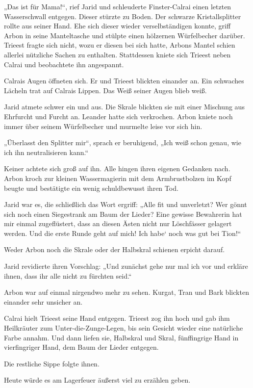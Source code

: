 „Das ist für Mama!“, rief Jarid und schleuderte Finster-Calrai einen letzten Wasserschwall entgegen. Dieser stürzte zu Boden. Der schwarze Kristallsplitter rollte aus seiner Hand. Ehe sich dieser wieder verselbständigen konnte, griff Arbon in seine Manteltasche und stülpte einen hölzernen Würfelbecher darüber. Trieest fragte sich nicht, wozu er diesen bei sich hatte, Arbons Mantel schien allerlei nützliche Sachen zu enthalten. Stattdessen kniete sich Trieest neben Calrai und beobachtete ihn angespannt.

Calrais Augen öffneten sich. Er und Trieest blickten einander an. Ein schwaches Lächeln trat auf Calrais Lippen. Das Weiß seiner Augen blieb weiß.

Jarid atmete schwer ein und aus. Die Skrale blickten sie mit einer Mischung aus Ehrfurcht und Furcht an. Leander hatte sich verkrochen. Arbon kniete noch immer über seinem Würfelbecher und murmelte leise vor sich hin.

„Überlasst den Splitter mir“, sprach er beruhigend, „Ich weiß schon genau, wie ich ihn neutralisieren kann.“

Keiner achtete sich groß auf ihn. Alle hingen ihren eigenen Gedanken nach. Arbon kroch zur kleinen Wassermagierin mit dem Armbrustbolzen im Kopf beugte und bestätigte ein wenig schuldbewusst ihren Tod.

Jarid war es, die schließlich das Wort ergriff: „Alle fit und unverletzt? Wer gönnt sich noch einen Siegestrank am Baum der Lieder? Eine gewisse Bewahrerin hat mir einmal zugeflüstert, dass an diesen Ästen nicht nur Löschfässer gelagert werden. Und die erste Runde geht auf mich! Ich habe‘ noch was gut bei Tion!“

Weder Arbon noch die Skrale oder der Halbskral schienen erpicht darauf.

Jarid revidierte ihren Vorschlag: „Und zunächst gehe nur mal ich vor und erkläre ihnen, dass ihr alle nicht zu fürchten seid.“

Arbon war auf einmal nirgendwo mehr zu sehen. Kurgat, Tran und Bark blickten einander sehr unsicher an.

Calrai hielt Trieest seine Hand entgegen. Trieest zog ihn hoch und gab ihm Heilkräuter zum Unter-die-Zunge-Legen, bis sein Gesicht wieder eine natürliche Farbe annahm. Und dann liefen sie, Halbskral und Skral, fünffingrige Hand in vierfingriger Hand, dem Baum der Lieder entgegen.

Die restliche Sippe folgte ihnen.

Heute würde es am Lagerfeuer äußerst viel zu erzählen geben.

